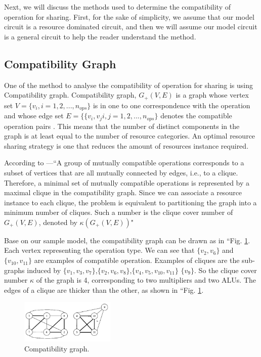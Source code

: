 Next, we will discuss the methods used to determine the compatibility of operation for sharing. First, for the sake of simplicity, we assume that our model circuit is a resource dominated circuit, and then we will assume our model circuit is a general circuit to help the reader understand the method. 

\subsection{Compatibility Graph}

 One of the method to analyse the compatibility of operation for sharing is using Compatibility graph. Compatibility graph, $G_{+}(V,E)$ is a graph whose vertex set  $  V = \{v_{i}, i = 1,2,..., n_{ops}\} $ is in one to one correspondence with the operation and whose edge set $ E = \{\{v_{i},v_{j} i,j = 1,2,...,n_{ops}\}$ denotes the compatible operation pairs \cite{main}. This means that the number of distinct components in the graph is at least equal to the number of resource categories. An optimal resource sharing strategy is one that reduces the amount of resources instance required\cite{main}.
 
 According to \cite{main}---``A group of mutually compatible operations corresponds to a subset of vertices that are all mutually connected by edges, i.e., to a clique. Therefore, a minimal set of mutually compatible operations is represented by a maximal clique in the compatibility graph. Since we can associate a resource instance to each clique, the problem is equivalent to partitioning the graph into a minimum number of cliques. Such a number is the clique cover number of $G_{+}(V,E)  $, denoted by $\kappa(G_{+}(V,E)) $"

 Base on our sample model, the compatibility graph can be drawn as in ``Fig. \ref{Compatibility_graph}. Each vertex representing the operation type. We can see that $\{v_{2},v_{6}\} $ and $\{v_{10},v_{11}\} $ are examples of compatible operation.  Examples of cliques are the sub-graphs induced by $\{v_{1},v_{3},v_{7}\}  $,$\{ v_{2},v_{6},v_{8}\} $,$\{ v_{4},v_{5}, v_{10}, v_{11}\}$ $ \{v_{9}\} $. So the clique cover number $ \kappa $ of the graph is 4, corresponding to two multipliers and two ALUs. The edges of a clique are thicker than the other, as shown in ``Fig. \ref{Compatibility_graph}.
 

\begin{figure}[h]
    \centering
    \includegraphics[width=0.4\textwidth]{Compatibility_graph}
    \caption{ Compatibility graph. \cite{main}}
    \label{Compatibility_graph}
\end{figure}

